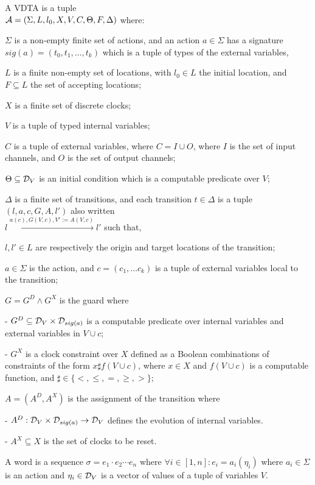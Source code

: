 \begin{definition}
	\label{def:ptav}
	A {VDTA} is a tuple \\
	${\mathcal A} = \left(\Sigma, L, {l_0}, X, V, C, \Theta, F,  \Delta \right)$ where:
	\squishlist
	\item $\Sigma$ is a non-empty finite set of actions,
	and an action $a \in \Sigma$ has a signature $sig(a) = ( t_0, t_1, \ldots, t_k )$ which is a tuple of types of the external variables,
	\item $L$ is a finite non-empty set of locations, with $l_0 \in L$ the initial location, and $F \subseteq L$ the set of accepting locations;
	\item $X$ is a finite set of discrete clocks;
	\item $V$ is a tuple of typed internal variables; 
	\item $C$ is a tuple of external variables, where $C = I \cup O$, where $I$ is the set of input channels, and $O$ is the set of output channels; 
	\item $\Theta\subseteq {\cal D}_{V }$ is an initial condition which is a computable predicate over $V$;
	\item $\Delta$ is a finite set of transitions, and each transition $t \in \Delta$ is a tuple $( l, a, c, G, A, l' )$
	also written\\
	$l \xrightarrow{a(c), G(V,c), V':=A(V,c)} l'$
	such that,
	\squishlist
	\item[\textbullet] $l, l' \in L$ are respectively the origin and target locations of the transition;
	\item[\textbullet] $a \in \Sigma$ is the action, and $c=( c_1, \ldots c_k )$ is a tuple of external variables local to the transition;
	\item[\textbullet] $G = G^D \wedge G^X$ is the guard where
	\squishlist
	\item[-] $G^D \subseteq {\cal D}_V \times {\cal D}_{sig(a)}$
	is a computable predicate over internal variables and external variables  in $V \cup c$;
	\item[-] $G^X$ is a clock constraint over $X$ defined as a Boolean combinations of constraints of the form $x \sharp f(V \cup c)$, where $x \in X$ and $f(V \cup c)$ is a computable function, and $\sharp \in \{ <, \leq, =, \geq, > \}$;
	\squishend
	\item[\textbullet] $A$$=$$(A^D, A^X)$ is the assignment of the transition where
	\squishlist
	\item[-] $A^D :{\cal D}_V \times {\cal D}_{sig(a)} \rightarrow {\cal D}_V$ defines the evolution of internal variables.
	\item[-] $A^X \subseteq X$ is the set of clocks to be reset.
	\squishend
	\squishend
	\squishend
\end{definition}
%
A word is a sequence $\sigma = e_1\cdot e_2 \cdots e_n$ where $\forall i \in [1,n]: e_i = a_i(\eta_i)$ where $a_i \in \Sigma$ is an action and $\eta_i \in {\cal D}_V$ is a vector of values of a tuple of variables $V$. 

